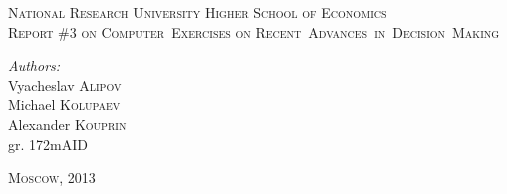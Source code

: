 \begin{titlepage}

\begin{center}
	\textsc{\Large National Research University Higher School of Economics}\\[8cm]

	\textsc{\large Report \#3 on Computer~Exercises on Recent~Advances~in~Decision~Making}\\[8cm]
\end{center}

\begin{flushright}
	\emph{Authors:}\\
	Vyacheslav \textsc{Alipov}\\
	Michael \textsc{Kolupaev}\\
	Alexander \textsc{Kouprin}\\
	gr. 172mAID
\end{flushright}

\vfill

\begin{center}
	\textsc{\large Moscow, 2013}
\end{center}

\end{titlepage}
